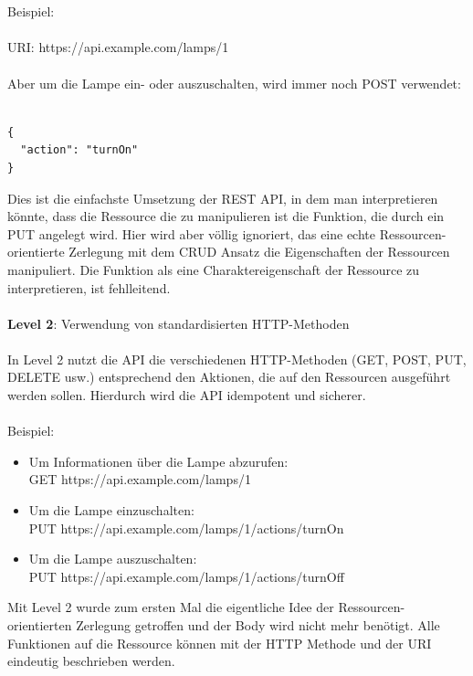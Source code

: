 \\\\
Beispiel:
\\\\
URI: https://api.example.com/lamps/1
\\\\
Aber um die Lampe ein- oder auszuschalten, wird immer noch POST verwendet:
\\\\
\noindent\begin{minipage}{\textwidth}
\begin{lstlisting}[caption={Level 1},captionpos=b,label={lst:level_1}]
{
  "action": "turnOn"
}
\end{lstlisting}
\end{minipage}
Dies ist die einfachste Umsetzung der REST API, in dem man interpretieren könnte, dass die Ressource  die zu manipulieren ist die Funktion, die durch ein PUT angelegt wird. Hier wird aber völlig ignoriert, das eine echte Ressourcen-orientierte Zerlegung mit dem CRUD Ansatz die Eigenschaften der Ressourcen manipuliert. Die Funktion als eine Charaktereigenschaft der Ressource zu interpretieren, ist fehlleitend. 
\\\\
\textbf{Level 2}: Verwendung von standardisierten HTTP-Methoden
\\\\
In Level 2 nutzt die API die verschiedenen HTTP-Methoden (GET, POST, PUT, DELETE usw.) entsprechend den Aktionen, die auf den Ressourcen ausgeführt werden sollen. Hierdurch wird die API idempotent und sicherer.
\\\\
Beispiel:
\begin{itemize}
\item Um Informationen über die Lampe abzurufen:\\ 
GET https://api.example.com/lamps/1
\item  Um die Lampe einzuschalten:\\ PUT https://api.example.com/lamps/1/actions/turnOn
\item Um die Lampe auszuschalten:\\ PUT https://api.example.com/lamps/1/actions/turnOff
\end{itemize}
Mit Level 2 wurde zum ersten Mal die eigentliche Idee der Ressourcen-orientierten Zerlegung getroffen und der Body wird nicht mehr benötigt. Alle Funktionen auf die Ressource können mit der HTTP Methode und der URI eindeutig beschrieben werden. 

